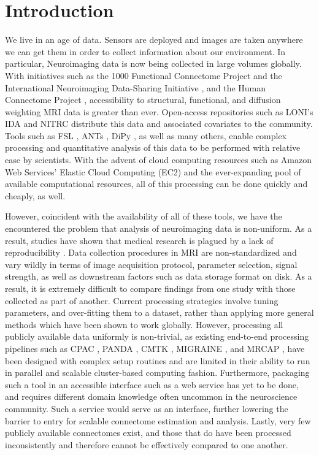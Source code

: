 \chapter{Introduction}
\label{sec:intro}
We live in an age of data. Sensors are deployed and images are taken anywhere we can get them in order to collect information about our environment. In particular, Neuroimaging data is now being collected in large volumes globally. With initiatives such as the 1000 Functional Connectome Project and the International Neuroimaging Data-Sharing Initiative \cite{fcpindi}, and the Human Connectome Project \cite{hcp}, accessibility to structural, functional, and diffusion weighting MRI data is greater than ever. Open-access repositories such as LONI's IDA\cite{loni1} and NITRC distribute this data and associated covariates to the community. Tools such as FSL \cite{fsl1,fsl2,fsl3}, ANTs \cite{ants}, DiPy \cite{dipy}, as well as many others, enable complex processing and quantitative analysis of this data to be performed with relative ease by scientists. With the advent of cloud computing resources such as Amazon Web Services' Elastic Cloud Computing (EC2) and the ever-expanding pool of available computational resources, all of this processing can be done quickly and cheaply, as well.

However, coincident with the availability of all of these tools, we have the encountered the problem that analysis of neuroimaging data is non-uniform. As a result, studies have shown that medical research is plagued by a lack of reproducibility \cite{reliability1,reliability2}. Data collection procedures in MRI are non-standardized and vary wildly in terms of image acquisition protocol, parameter selection, signal strength, as well as downstream factors such as data storage format on disk. As a result, it is extremely difficult to compare findings from one study with those collected as part of another. Current processing strategies involve tuning parameters, and over-fitting them to a dataset, rather than applying more general methods which have been shown to work globally. However, processing all publicly available data uniformly is non-trivial, as existing end-to-end processing pipelines such as CPAC \cite{cpac}, PANDA \cite{panda}, CMTK \cite{cmtk}, MIGRAINE \cite{migraine}, and MRCAP \cite{mrcap}, have been designed with complex setup routines and are limited in their ability to run in parallel and scalable cluster-based computing fashion. Furthermore, packaging such a tool in an accessible interface such as a web service has yet to be done, and requires different domain knowledge often uncommon in the neuroscience community. Such a service would serve as an interface, further lowering the barrier to entry for scalable connectome estimation and analysis. Lastly, very few publicly available connectomes exist, and those that do have been processed inconsistently and therefore cannot be effectively compared to one another.

